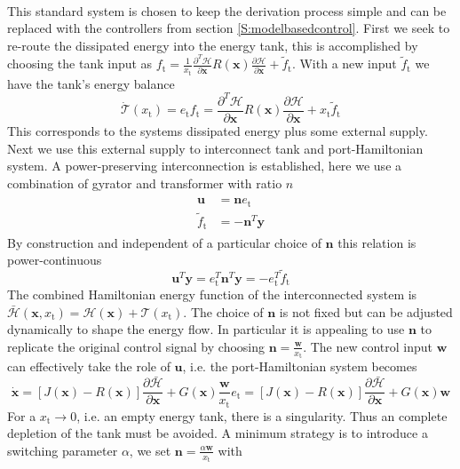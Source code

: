 \documentclass[a4paper,twoside, openright,12pt]{report}
\newcommand{\f}[1]{\boldsymbol{#1}}
\newcommand{\g}[1]{\text{#1}}
\begin{document}
{\begin{eqnarray}
\end{eqnarray}
This standard system is chosen to keep the derivation process simple and can be replaced with the controllers from section \ref{S:modelbasedcontrol}.
First we seek to re-route the dissipated energy into the energy tank, this is accomplished by choosing the tank input as $f_\g{t} = \frac{1}{x_\g{t}}\frac{\partial^T \mathcal{H}}{\partial \f{x}}R(\f{x})\frac{\partial \mathcal{H}}{\partial \f{x}} + \tilde{f}_\g{t}$. With a new input $\tilde{f}_\g{t}$ we have the tank's energy balance
\begin{equation}\label{EQ:tankpower}
\dot{\mathcal{T}}(x_\g{t})=e_\g{t}f_\g{t} = \frac{\partial^T \mathcal{H}}{\partial \f{x}}R(\f{x})\frac{\partial \mathcal{H}}{\partial \f{x}} + x_\g{t}\tilde{f}_\g{t}
\end{equation}
This corresponds to the systems dissipated energy plus some external supply. Next we use this external supply to interconnect tank and port-Hamiltonian system. A power-preserving interconnection is established, here we use a combination of gyrator and transformer with ratio $n$
\begin{eqnarray}
\begin{aligned}
\f{u} &= \f{n}e_\g{t} \\
\tilde{f}_\g{t} &= -\f{n}^T\f{y}
\end{aligned}
\end{eqnarray}
By construction and independent of a particular choice of $\f{n}$ this relation is power-continuous
\begin{equation}
\f{u}^T\f{y} = e_\g{t}^T\f{n}^T\f{y} = -e_\g{t}^T\tilde{f}_\g{t}
\end{equation}
The combined Hamiltonian energy function of the interconnected system is $\bar{\mathcal{H}}(\f{x},x_\g{t})=\mathcal{H}(\f{x})+\mathcal{T}(x_\g{t})$. The choice of $\f{n}$ is not fixed but can be adjusted dynamically to shape the energy flow. In particular it is appealing to use $\f{n}$ to replicate the original control signal by choosing $\f{n} = \frac{\f{w}}{x_\g{t}}$. The new control input $\f{w}$ can effectively take the role of $\f{u}$, i.e. the port-Hamiltonian system becomes
\begin{equation}
\dot{\f{x}} = [J(\f{x}) - R(\f{x})] \frac{\partial \bar{\mathcal{H}}}{\partial \f{x}} + G(\f{x})\frac{\f{w}}{x_\g{t}}e_\g{t} = [J(\f{x}) - R(\f{x})] \frac{\partial \bar{\mathcal{H}}}{\partial \f{x}} + G(\f{x})\f{w}
\end{equation}
For a $x_\g{t}\rightarrow0$, i.e. an empty energy tank, there is a singularity. Thus an complete depletion of the tank must be avoided. A minimum strategy is to introduce a switching parameter $\alpha$, we set $\f{n}=\frac{\alpha \f{w}}{x_\g{t}}$ with 
}
\end{document}
